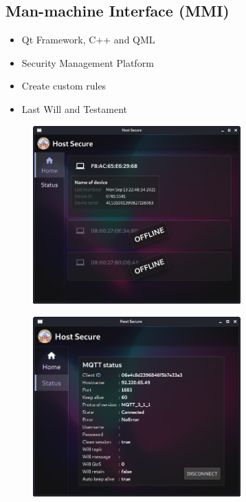 \subsection{Man-machine Interface (MMI)}
\begin{frame}{\insertsubsection}
    \begin{itemize}
    
        \item Qt Framework, C++ and QML
        \item Security Management Platform
        \item Create custom rules
        \item Last Will and Testament
    \end{itemize}
        \begin{figure}[h]
        \centering
        \includegraphics[width=8cm]{img/mmi_home.png}
        \label{fig:db_erdiagram}
    \end{figure}
    
\end{frame}


\begin{frame}{\insertsubsection}
    \begin{figure}[h]
        \centering
        \includegraphics[width=8cm]{img/mmi_status.png}
        \label{fig:db_erdiagram}
    \end{figure}
\end{frame}

